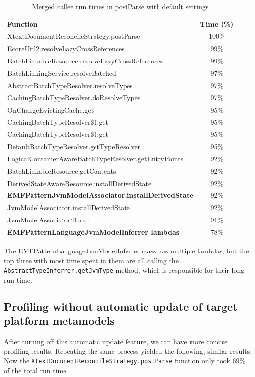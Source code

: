 \documentclass[11pt,a4paper,oneside]{report}
\begin{document}
\begin{table}[ht]
    \footnotesize
    \centering
    \begin{tabular}{ l c }
        \toprule
        Function & Time (\%) \\
        \midrule
        XtextDocumentReconcileStrategy.postParse & 100\% \\
        EcoreUtil2.resolveLazyCrossReferences & 99\% \\
        BatchLinkableResource.resolveLazyCrossReferences & 99\% \\
        BatchLinkingService.resolveBatched & 97\% \\
        AbstractBatchTypeResolver.resolveTypes & 97\% \\
        CachingBatchTypeResolver.doResolveTypes & 97\% \\
        OnChangeEvictingCache.get & 95\% \\
        CachingBatchTypeResolver\$1.get & 95\% \\
        CachingBatchTypeResolver\$1.get & 95\% \\
        DefaultBatchTypeResolver.getTypeResolver & 95\% \\
        LogicalContainerAwareBatchTypeResolver.getEntryPoints & 92\% \\
        BatchLinkableResource.getContents & 92\% \\
        DerivedStateAwareResource.installDerivedState & 92\% \\
        \textbf{EMFPatternJvmModelAssociator.installDerivedState} & 92\% \\
        JvmModelAssociator.installDerivedState & 92\% \\
        JvmModelAssociator\$1.run & 91\% \\
        \textbf{EMFPatternLanguageJvmModelInferrer lambdas} & 78\% \\
        \bottomrule
    \end{tabular}
    \caption{Merged callee run times in postParse with default settings}
    \label{tab:postparse-default}
\end{table}

The EMFPatternLanguageJvmModelInferrer class has multiple lambdas, but the top
three with most time spent in them are all calling the
\texttt{AbstractTypeInferrer.getJvmType} method, which is responsible for their
long run time.

\subsection{Profiling without automatic update of target platform metamodels}
After turning off this automatic update feature, we can have more concise
profiling results. Repeating the same process yielded the following, similar
results. Now the \texttt{XtextDocumentReconcileStrategy.postParse} function only
took 69\% of the total run time.
\end{document}
